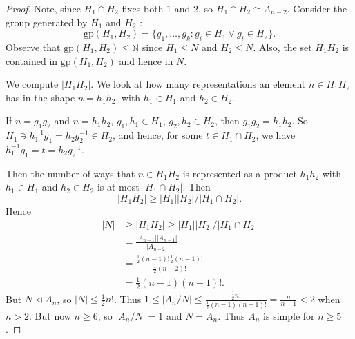 \begin{proof}
	Note, since $H_1 \cap H_2$ fixes both $1$ and $2$, so $H_1 \cap H_2 \cong A_{n-2}$.
	Consider the group generated by $H_1$ and $H_2$ :
	\[
		\text{gp}(H_1,H_2) 
		=\{g_1,\ldots,g_k: g_i \in H_1 \lor g_i \in H_2\} .
	\]
	Observe that $\text{gp}(H_1, H_2)\le \mathbb{N}$ since $H_1 \le N$ and $H_2 \le N$. 
	Also, the set $H_1H_2$ is contained in $\text{gp}(H_1, H_2)$ and hence in $N$.

	We compute $|H_1H_2|$. We look at how many representations an element $n \in H_1H_2$ has in the shape $n = h_1h_2$, with $h_1 \in H_1$ and $h_2 \in H_2$.

	If $n = g_1g_2$ and $n=h_1h_2$, $g_1,h_1 \in H_1$, $g_2, h_2 \in H_2$, then $g_1g_2 = h_1h_2$.
	So $H_1 \ni h_1^{-1} g_1 = h_2 g_2^{-1} \in H_2$, and hence, for some $t \in H_1 \cap H_2$, we have $h_1^{-1} g_1 = t = h_2 g_2^{-1}$.

	Then the number of ways that $n \in H_1H_2$ is represented as a product $h_1h_2$ with $h_1 \in H_1$ and $h_2 \in H_2$ is at most $|H_1 \cap H_2|$. Then \[
		|H_1H_2| \ge |H_1| |H_2| / |H_1 \cap H_2|
	.\] 
	Hence 
	\begin{align*}
		|N| &\ge  |H_1 H_2| \ge |H_1| |H_2| / |H_1 \cap  H_2| \\
		    &= \frac{|A_{n-1}||A_{n-1}|}{|A_{n-2}|} \\
		    &= \frac{\frac{1}{2}(n-1)!\frac{1}{2}(n-1)!}{\frac{1}{2}(n-2)!}\\
		    &= \frac{1}{2} (n-1) (n-1)!
	.\end{align*} 
But $N \triangleleft A_n$, so $|N| \le \frac{1}{2} n!$. Thus $1 \le |A_n / N| \le \frac{\frac{1}{2} n!}{\frac{1}{2} (n-1) (n-1)!} = \frac{n}{n-1}<2$ when $n >2$. But now $n \ge 6$, so $|A_n / N| = 1$ and $N = A_n$. Thus $A_n$ is simple for $n \ge 5$.
\end{proof}

	
